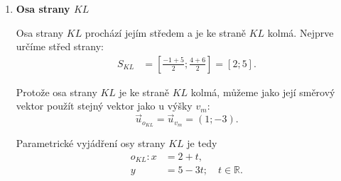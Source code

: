 \begin{example}
\begin{enumerate}[label=\alph*), leftmargin=2em]
\begin{figure}[H]
            \caption{Výška $v_m$ prochází vrcholem $M$ a je kolmá k přímce obsahující stranu $KL$.}
            \label{fig:Triangle_altitude_vm}
        \end{figure}

        \item \textbf{Osa strany $KL$}

        Osa strany $KL$ prochází jejím středem a je ke straně $KL$ kolmá. Nejprve určíme střed strany:
        \begin{align*}
            S_{KL}
            &=
            \left[
                \frac{-1+5}{2};
                \frac{4+6}{2}
            \right]
            =
            [2;5].
        \end{align*}

        Protože osa strany $KL$ je ke straně $KL$ kolmá, můžeme jako
        její směrový vektor použít stejný vektor jako u výšky $v_m$:
        \[
            \vec{u}_{o_{KL}} = \vec{u}_{v_m} = (1;-3).
        \]

        Parametrické vyjádření osy strany $KL$ je tedy
        \begin{align*}
            o_{KL}: x &= 2+t,\\
                    y &= 5-3t;
                    \quad t\in\mathbb{R}.
        \end{align*}


\end{enumerate}
\end{example}
